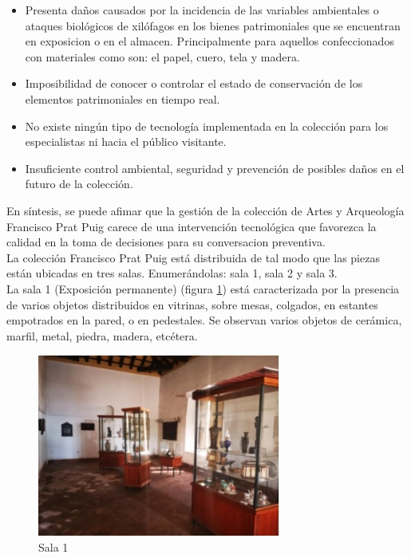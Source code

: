     \begin{itemize}
        \item Presenta daños causados por la incidencia de las variables ambientales o ataques biológicos de xilófagos en los bienes patrimoniales que se encuentran en exposicion o en el almacen. Principalmente para aquellos confeccionados con materiales como son: el papel, cuero, tela y madera.
        \item Imposibilidad de conocer o controlar el estado de conservación de los elementos patrimoniales en tiempo real.
        \item No existe ningún tipo de tecnología implementada en la colección para los especialistas ni hacia el público visitante.
        \item Insuficiente control ambiental, seguridad y prevención de posibles daños en el futuro de la colección.
    \end{itemize}

    En síntesis, se puede afimar que la gestión de la colección de Artes y Arqueología Francisco Prat Puig carece de una intervención tecnológica que favorezca la calidad en la toma de decisiones para su conversacion preventiva.\\

    La colección Francisco Prat Puig está distribuida de tal modo que las piezas están ubicadas en tres salas. Enumerándolas: sala 1, sala 2 y sala 3.\\
    La sala 1 (Exposición permanente) (figura \ref{imag:sala_1}) está caracterizada por la presencia de varios objetos distribuidos en vitrinas, sobre mesas, colgados, en estantes empotrados en la pared, o en pedestales. Se observan varios objetos de cerámica, marfil, metal, piedra, madera, etcétera.\newline
    
    \begin{figure}[H]
        \centering
        \includegraphics[width=8cm, height=6cm]{imagenes/sala_1.jpg}
        \caption{Sala 1}
        \label{imag:sala_1}
    \end{figure}


